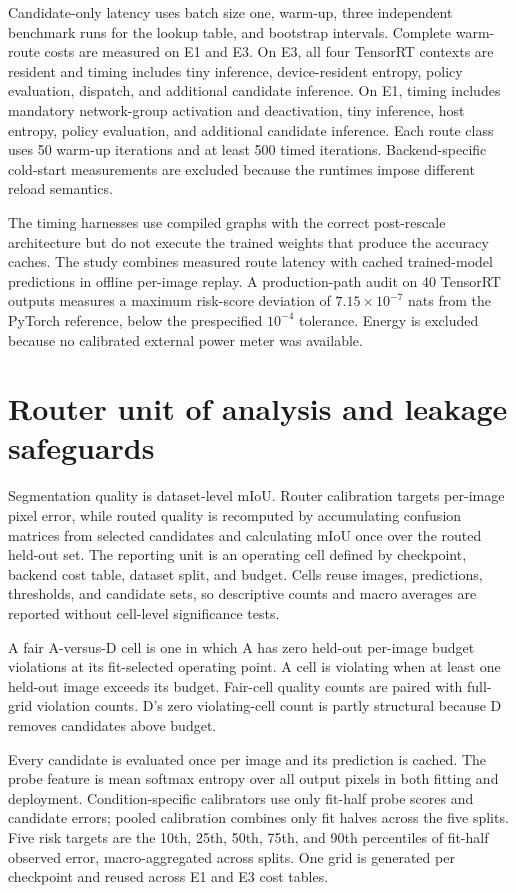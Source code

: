 \documentclass[a4paper,review,12pt]{elsarticle}
\newcommand{\miou}{mIoU}
\begin{document}
Candidate-only latency uses batch size one, warm-up, three independent benchmark runs for the lookup table, and bootstrap intervals. Complete warm-route costs are measured on E1 and E3. On E3, all four TensorRT contexts are resident and timing includes tiny inference, device-resident entropy, policy evaluation, dispatch, and additional candidate inference. On E1, timing includes mandatory network-group activation and deactivation, tiny inference, host entropy, policy evaluation, and additional candidate inference. Each route class uses 50 warm-up iterations and at least 500 timed iterations. Backend-specific cold-start measurements are excluded because the runtimes impose different reload semantics.

The timing harnesses use compiled graphs with the correct post-rescale architecture but do not execute the trained weights that produce the accuracy caches. The study combines measured route latency with cached trained-model predictions in offline per-image replay. A production-path audit on 40 TensorRT outputs measures a maximum risk-score deviation of $7.15\times10^{-7}$ nats from the PyTorch reference, below the prespecified $10^{-4}$ tolerance. Energy is excluded because no calibrated external power meter was available.

\section{Router unit of analysis and leakage safeguards}

Segmentation quality is dataset-level \miou{}. Router calibration targets per-image pixel error, while routed quality is recomputed by accumulating confusion matrices from selected candidates and calculating \miou{} once over the routed held-out set. The reporting unit is an operating cell defined by checkpoint, backend cost table, dataset split, and budget. Cells reuse images, predictions, thresholds, and candidate sets, so descriptive counts and macro averages are reported without cell-level significance tests.

A fair A-versus-D cell is one in which A has zero held-out per-image budget violations at its fit-selected operating point. A cell is violating when at least one held-out image exceeds its budget. Fair-cell quality counts are paired with full-grid violation counts. D's zero violating-cell count is partly structural because D removes candidates above budget.

Every candidate is evaluated once per image and its prediction is cached. The probe feature is mean softmax entropy over all output pixels in both fitting and deployment. Condition-specific calibrators use only fit-half probe scores and candidate errors; pooled calibration combines only fit halves across the five splits. Five risk targets are the 10th, 25th, 50th, 75th, and 90th percentiles of fit-half observed error, macro-aggregated across splits. One grid is generated per checkpoint and reused across E1 and E3 cost tables.
\end{document}

